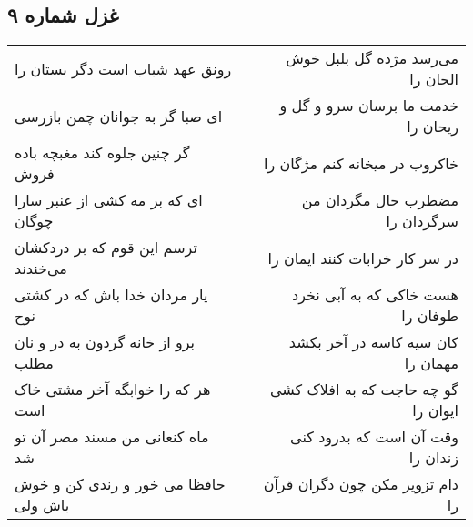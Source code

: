 \begin{center}
\section*{غزل شماره ۹}
\label{sec:sh009}
\begin{longtable}{l p{0.5cm} r}
رونق عهد شباب است دگر بستان را
&&
می‌رسد مژده گل بلبل خوش الحان را
\\
ای صبا گر به جوانان چمن بازرسی
&&
خدمت ما برسان سرو و گل و ریحان را
\\
گر چنین جلوه کند مغبچه باده فروش
&&
خاکروب در میخانه کنم مژگان را
\\
ای که بر مه کشی از عنبر سارا چوگان
&&
مضطرب حال مگردان من سرگردان را
\\
ترسم این قوم که بر دردکشان می‌خندند
&&
در سر کار خرابات کنند ایمان را
\\
یار مردان خدا باش که در کشتی نوح
&&
هست خاکی که به آبی نخرد طوفان را
\\
برو از خانه گردون به در و نان مطلب
&&
کان سیه کاسه در آخر بکشد مهمان را
\\
هر که را خوابگه آخر مشتی خاک است
&&
گو چه حاجت که به افلاک کشی ایوان را
\\
ماه کنعانی من مسند مصر آن تو شد
&&
وقت آن است که بدرود کنی زندان را
\\
حافظا می خور و رندی کن و خوش باش ولی
&&
دام تزویر مکن چون دگران قرآن را
\\
\end{longtable}
\end{center}
